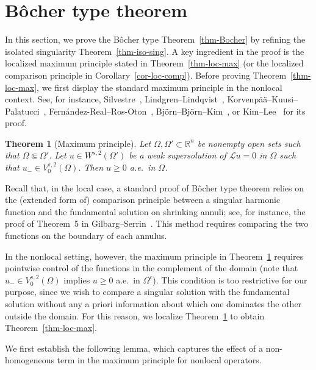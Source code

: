 \documentclass[11pt]{amsart}
\theoremstyle{plain}
\newtheorem{theorem}{Theorem}[section]
\theoremstyle{definition}
\numberwithin{equation}{section}
\begin{document}
\section{B\^ocher type theorem}\label{sec-Bocher}

In this section, we prove the B\^ocher type Theorem~\ref{thm-Bocher} by refining the isolated singularity Theorem~\ref{thm-iso-sing}. A key ingredient in the proof is the localized maximum principle stated in Theorem~\ref{thm-loc-max} (or the localized comparison principle in Corollary~\ref{cor-loc-comp}). Before proving Theorem~\ref{thm-loc-max}, we first display the standard maximum principle in the nonlocal context. See, for instance, Silvestre~\cite[Proposition~2.21]{Sil07}, Lindgren--Lindqvist~\cite[Lemma~9]{LL14}, Korvenp\"a\"a--Kuusi--Palatucci~\cite[Lemma~6]{KKP17}, Fern\'andez-Real--Ros-Oton~\cite[Lemma~2.3.3 and Corollary 2.3.4]{FRRO24}, Bj\"orn--Bj\"orn--Kim~\cite[Corollary~3.6]{BBK24}, or Kim--Lee~\cite[Lemma~5.2]{KL23} for its proof.

\begin{theorem}[Maximum principle]\label{thm-MP}
Let $\Omega, \Omega' \subset \mathbb{R}^n$ be nonempty open sets such that $\Omega \Subset \Omega'$. Let $u \in W^{s, 2}(\Omega')$ be a weak supersolution of $\mathcal{L}u=0$ in $\Omega$ such that $u_- \in V^{s, 2}_0(\Omega)$. Then $u \geq 0$ a.e.\ in $\Omega$.
\end{theorem}

Recall that, in the local case, a standard proof of B\^ocher type theorem relies on the (extended form of) comparison principle between a singular harmonic function and the fundamental solution on shrinking annuli; see, for instance, the proof of Theorem~5 in Gilbarg--Serrin~\cite{GS56}. This method requires comparing the two functions on the boundary of each annulus.

In the nonlocal setting, however, the maximum principle in Theorem~\ref{thm-MP} requires pointwise control of the functions in the complement of the domain (note that $u_- \in V^{s, 2}_0(\Omega)$ implies $u \geq 0$ a.e.\ in $\Omega^c$). This condition is too restrictive for our purpose, since we wish to compare a singular solution with the fundamental solution without any a priori information about which one dominates the other outside the domain. For this reason, we localize Theorem~\ref{thm-MP} to obtain Theorem~\ref{thm-loc-max}.

We first establish the following lemma, which captures the effect of a non-homogeneous term in the maximum principle for nonlocal operators.
\end{document}
